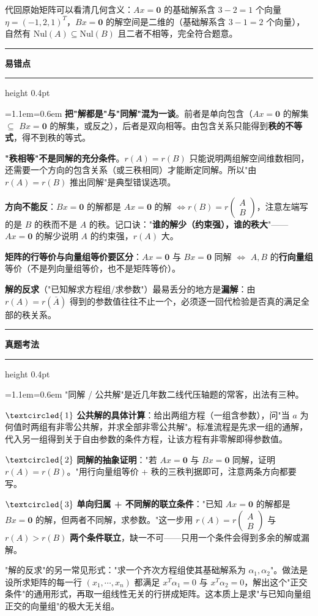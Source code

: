 \documentclass[11pt,openany,UTF8]{ctexbook}
\newcommand{\circled}[1]{\textcircled{\scriptsize\,#1}}
\newcommand{\callouthead}[2]{%
  \par\addvspace{7pt}\noindent
  {\color{#1}\rule[-0.15em]{3pt}{1.05em}}\hspace{0.5em}%
  {\bfseries\color{#1}#2}\par\nobreak\vspace{-0.35em}%
  {\color{rulesep}\hrule height 0.4pt}\nobreak\vspace{0.45em}%
  \begingroup\small\setlength{\parindent}{0pt}%
  \leftskip=1.1em\rightskip=0.6em\noindent\ignorespaces}
\newcommand{\calloutend}{\par\endgroup\addvspace{7pt}}
\newenvironment{callwarn}[1]{\callouthead{warnbar}{#1}}{\calloutend}
\newenvironment{callexam}[1]{\callouthead{exambar}{#1}}{\calloutend}
\begin{document}
代回原始矩阵可以看清几何含义：$Ax=\mathbf{0}$ 的基础解系含 $3-2=1$ 个向量 $\eta=(-1,2,1)^T$，$Bx=\mathbf{0}$ 的解空间是二维的（基础解系含 $3-1=2$ 个向量），自然有 $\mathrm{Nul}(A)\subseteq\mathrm{Nul}(B)$ 且二者不相等，完全符合题意。

\begin{callwarn}{易错点}
\textbf{把"解都是"与"同解"混为一谈}。前者是单向包含（$Ax=\mathbf{0}$ 的解集 $\subseteq$ $Bx=\mathbf{0}$ 的解集，或反之），后者是双向相等。由包含关系只能得到\textbf{秩的不等式}，得不到秩的等式。

\textbf{"秩相等"不是同解的充分条件}。$r(A)=r(B)$ 只能说明两组解空间维数相同，还需要一个方向的包含关系（或三秩相同）才能断定同解。所以"由 $r(A)=r(B)$ 推出同解"是典型错误选项。

\textbf{方向不能反}：$Bx=\mathbf{0}$ 的解都是 $Ax=\mathbf{0}$ 的解 $\iff r(B)=r\begin{pmatrix} A \\ B \end{pmatrix}$，注意左端写的是 $B$ 的秩而不是 $A$ 的秩。记口诀："\textbf{谁的解少（约束强），谁的秩大}"——$Ax=\mathbf{0}$ 的解少说明 $A$ 的约束强，$r(A)$ 大。

\textbf{矩阵的行等价与向量组等价要区分}：$Ax=\mathbf{0}$ 与 $Bx=\mathbf{0}$ 同解 $\iff$ $A,B$ 的\textbf{行向量组}等价（不是列向量组等价，也不是矩阵等价）。

\textbf{解的反求}（"已知解求方程组/求参数"）最易丢分的地方是\textbf{漏解}：由 $r(A)=r(\bar A)$ 得到的参数值往往不止一个，必须逐一回代检验是否真的满足全部的秩关系。

\end{callwarn}

\begin{callexam}{真题考法}
"同解 / 公共解"是近几年数二线代压轴题的常客，出法有三种。

$\circled{1}$ \textbf{公共解的具体计算}：给出两组方程（一组含参数），问"当 $a$ 为何值时两组有非零公共解，并求全部非零公共解"。标准流程是先求一组的通解，代入另一组得到关于自由参数的条件方程，让该方程有非零解即得参数值。

$\circled{2}$ \textbf{同解的抽象证明}："若 $Ax=\mathbf{0}$ 与 $Bx=\mathbf{0}$ 同解，证明 $r(A)=r(B)$。"用行向量组等价 + 秩的三秩判据即可，注意两条方向都要写。

$\circled{3}$ \textbf{单向归属 + 不同解的联立条件}："已知 $Ax=\mathbf{0}$ 的解都是 $Bx=\mathbf{0}$ 的解，但两者不同解，求参数。"这一步用 $r(A)=r\begin{pmatrix} A \\ B \end{pmatrix}$ 与 $r(A)>r(B)$ \textbf{两个条件联立}，缺一不可——只用一个条件会得到多余的解或漏解。

"解的反求"的另一常见形式："求一个齐次方程组使其基础解系为 $\alpha_1,\alpha_2$"。做法是设所求矩阵的每一行 $(x_1,\cdots,x_n)$ 都满足 $x^T\alpha_1=0$ 与 $x^T\alpha_2=0$，解出这个"正交条件"的通用形式，再取一组线性无关的行拼成矩阵。这本质上是求"与已知向量组正交的向量组"的极大无关组。

\end{callexam}
\end{document}
